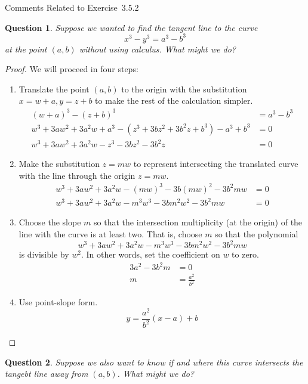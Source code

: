 \documentclass[12pt]{article}
\theoremstyle{plain}
\newtheorem{ex}{Question}
\begin{document}
Comments Related to Exercise~3.5.2 \vspace{\baselineskip}

\begin{ex}
  Suppose we wanted to find the tangent line to the curve
  \[
    x^3-y^3=a^3-b^3
  \]
  at the point $(a,b)$ without using calculus. What might we do?
\end{ex}

\begin{proof}
  We will proceed in four steps:
  \begin{enumerate}
    \item[\textbf{Step~1}] Translate the point $(a,b)$ to the origin with the substitution $x=w+a,y=z+b$ to make the rest of the calculation simpler.
    \begin{align*}
      (w+a)^3-(z+b)^3                                   &= a^3-b^3 \\
      w^3+3aw^2+3a^2w+a^3-(z^3+3bz^2+3b^2z+b^3)-a^3+b^3 &= 0 \\
      w^3+3aw^2+3a^2w-z^3-3bz^2-3b^2z                   &= 0
    \end{align*}
    \item[\textbf{Step~2}] Make the substitution $z=mw$ to represent intersecting the translated curve with the line through the origin $z=mw$.
    \begin{align*}
      w^3+3aw^2+3a^2w-(mw)^3-3b(mw)^2-3b^2mw  &= 0 \\
      w^3+3aw^2+3a^2w-m^3w^3-3bm^2w^2-3b^2mw  &= 0
    \end{align*}
    \item[\textbf{Step~3}] Choose the slope $m$ so that the intersection multiplicity (at the origin) of the line with the curve is at least two. That is, choose $m$ so that the polynomial
    \[
      w^3+3aw^2+3a^2w-m^3w^3-3bm^2w^2-3b^2mw
    \]
    is divisible by $w^2$. In other words, set the coefficient on $w$ to zero.
    \begin{align*}
      3a^2-3b^2m  &= 0 \\
      m           &= \frac{a^2}{b^2}
    \end{align*}
    \item[\textbf{Step~4}] Use point-slope form.
    \[
      y=\frac{a^2}{b^2}(x-a)+b
    \]
  \end{enumerate}
\end{proof}

\begin{ex}
  Suppose we also want to know if and where this curve intersects the tangebt line away from $(a,b)$. What might we do?
\end{ex}
\end{document}
